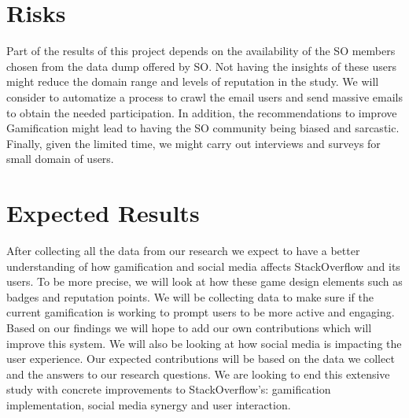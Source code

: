\documentclass{sigchi}
\begin{document}
\section{Risks}

Part of the results of this project depends on the availability of the SO
members chosen from the data dump offered by SO. Not having the insights of
these users might reduce the domain range and levels of reputation in the
study. We will consider to automatize a process to crawl the email users and
send massive emails to obtain the needed participation. In addition, the
recommendations to improve Gamification might lead to having the SO community
being biased and sarcastic. Finally, given the limited time, we might carry out
interviews and surveys for small domain of users.


\section{Expected Results}

After collecting all the data from our research we expect to have a better
understanding of how gamification and social media affects StackOverflow and
its users. To be more precise, we will look at how these game design elements
such as badges and reputation points. We will be collecting data to make sure
if the current gamification is working to prompt users to be more active and
engaging. Based on our findings we will hope to add our own contributions
which will improve this system. We will also be looking at how social media is
impacting the user experience. Our expected contributions will be based on the
data we collect and the answers to our research questions. We are looking to
end this extensive study with concrete improvements to StackOverflow’s:
gamification implementation, social media synergy and user interaction.




% 
% 
\end{document}
